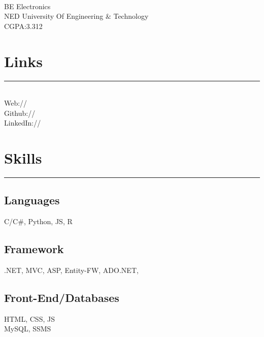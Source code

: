 \documentclass[]{ShumailaAhmed-Resume}
\begin{document}
%
%

\begin{minipage}[t]{0.33\textwidth} 
\begin{large}
	\\
\end{large}
BE Electronics\\
NED University Of Engineering $\&$ Technology \\ 
CGPA:3.312
\section{Links} 
\noindent\rule{5cm}{0.4pt}\\
Web:// \href{https://www.shumailaahmed.net}{} \\
Github:// \href{https://github.com/ShumailaAhmed}{} \\
LinkedIn://  \href{https://www.linkedin.com/in/shumaila-ahmed}{} \\


\section{Skills}
\noindent\rule{5cm}{0.4pt}
\subsection{Languages}
C/C\#, Python, JS, R
\vspace{6pt}
\subsection{Framework}
.NET, MVC, ASP, Entity-FW, ADO.NET,
\vspace{6pt}
\subsection{Front-End/Databases}
HTML, CSS, JS\\
MySQL, SSMS
\vspace{6pt}

\end{minipage}
\end{document}

